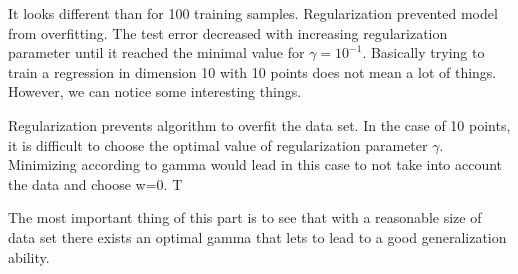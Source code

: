 \documentclass{article} %
\begin{document}
It looks different than for 100 training samples. Regularization prevented model from overfitting. The test error decreased with increasing regularization parameter until it reached the minimal value for $\gamma = 10^{-1}$. Basically trying to train a regression in dimension 10 with 10 points does not mean a lot of things. However, we can notice some interesting things. 

Regularization prevents algorithm to overfit the data set. In the case of 10 points, it is difficult to choose the optimal value of regularization parameter $\gamma$. Minimizing according to gamma would lead in this case to not take into account the data and choose w=0. T

The most important thing of this part is to see that with a reasonable size of data set there exists an optimal gamma that lets to lead to a good generalization ability. 
\end{document}
